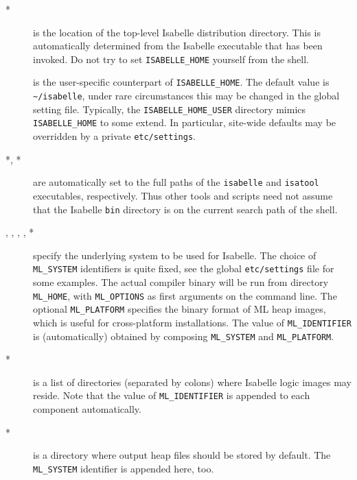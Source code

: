 \begin{description}
\item[*] is the location of the top-level
  Isabelle distribution directory. This is automatically determined
  from the Isabelle executable that has been invoked.  Do not try to
  set \texttt{ISABELLE_HOME} yourself from the shell.

\item[] is the user-specific counterpart of
  \texttt{ISABELLE_HOME}. The default value is
  \texttt{\~\relax/isabelle}, under rare circumstances this may be
  changed in the global setting file.  Typically, the
  \texttt{ISABELLE_HOME_USER} directory mimics \texttt{ISABELLE_HOME}
  to some extend. In particular, site-wide defaults may be overridden
  by a private \texttt{etc/settings}.

\item[*, *] are automatically set to
  the full paths of the \texttt{isabelle} and \texttt{isatool}
  executables, respectively.  Thus other tools and scripts need not
  assume that the Isabelle \texttt{bin} directory is on the current
  search path of the shell.
  
\item[, , ,
  , *] specify the underlying {\ML}
  system to be used for Isabelle.  The choice of \texttt{ML_SYSTEM}
  identifiers is quite fixed, see the global \texttt{etc/settings} file for
  some examples. The actual compiler binary will be run from directory
  \texttt{ML_HOME}, with \texttt{ML_OPTIONS} as first arguments on the command
  line.  The optional \texttt{ML_PLATFORM} specifies the binary format of ML
  heap images, which is useful for cross-platform installations.  The value of
  \texttt{ML_IDENTIFIER} is (automatically) obtained by composing
  \texttt{ML_SYSTEM} and \texttt{ML_PLATFORM}.
  
\item[*] is a list of directories (separated by colons)
  where Isabelle logic images may reside. Note that the value of
  \texttt{ML_IDENTIFIER} is appended to each component automatically.

\item[*] is a directory where output heap
  files should be stored by default. The \texttt{ML_SYSTEM} identifier
  is appended here, too.


\end{description}
